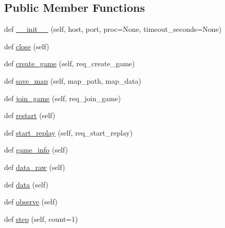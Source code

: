 \subsection*{Public Member Functions}
\begin{DoxyCompactItemize}
\item 
def \mbox{\hyperlink{classpysc2_1_1lib_1_1remote__controller_1_1_remote_controller_a12ff18dcbc552d7fb96819b4e2005384}{\+\_\+\+\_\+init\+\_\+\+\_\+}} (self, host, port, proc=None, timeout\+\_\+seconds=None)
\item 
def \mbox{\hyperlink{classpysc2_1_1lib_1_1remote__controller_1_1_remote_controller_a6eac6b1034679ad54da9eeb309b147f1}{close}} (self)
\item 
def \mbox{\hyperlink{classpysc2_1_1lib_1_1remote__controller_1_1_remote_controller_aa6c03198b58d0ea4c3c6af3d9a29fb5c}{create\+\_\+game}} (self, req\+\_\+create\+\_\+game)
\item 
def \mbox{\hyperlink{classpysc2_1_1lib_1_1remote__controller_1_1_remote_controller_a8d4814c56a3480e8522e1fedf4239742}{save\+\_\+map}} (self, map\+\_\+path, map\+\_\+data)
\item 
def \mbox{\hyperlink{classpysc2_1_1lib_1_1remote__controller_1_1_remote_controller_a2425abd677f568e0a04ae474edc07650}{join\+\_\+game}} (self, req\+\_\+join\+\_\+game)
\item 
def \mbox{\hyperlink{classpysc2_1_1lib_1_1remote__controller_1_1_remote_controller_ae1a5b202f8b9250778946884c4f6d128}{restart}} (self)
\item 
def \mbox{\hyperlink{classpysc2_1_1lib_1_1remote__controller_1_1_remote_controller_a2e7a744b2dcbce22e9d98dafa8ccb66c}{start\+\_\+replay}} (self, req\+\_\+start\+\_\+replay)
\item 
def \mbox{\hyperlink{classpysc2_1_1lib_1_1remote__controller_1_1_remote_controller_a56f229658ab46f3470ea604d431bb793}{game\+\_\+info}} (self)
\item 
def \mbox{\hyperlink{classpysc2_1_1lib_1_1remote__controller_1_1_remote_controller_af7e69dffc014572c52d7c09942cc6901}{data\+\_\+raw}} (self)
\item 
def \mbox{\hyperlink{classpysc2_1_1lib_1_1remote__controller_1_1_remote_controller_a8ce6ceb715e8d008c25f8c2f2e7aab0d}{data}} (self)
\item 
def \mbox{\hyperlink{classpysc2_1_1lib_1_1remote__controller_1_1_remote_controller_a23ecae343e7a591f3d86a7d2817228eb}{observe}} (self)
\item 
def \mbox{\hyperlink{classpysc2_1_1lib_1_1remote__controller_1_1_remote_controller_a4c720cf218cc8a0917f494c24f3957f5}{step}} (self, count=1)

\end{DoxyCompactItemize}
